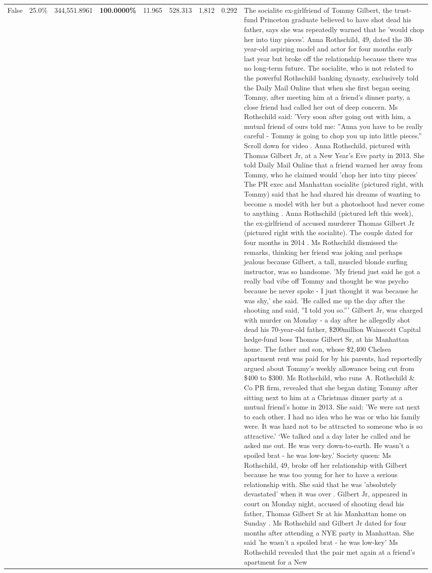 \begin{table}[H]
\begin{tabular}{lllrlllll}
False & 25.0\% & 344,551.8961 & \bfseries \color{red} 100.0000\% & 11.965 & 528.313 & 1,812 & 0.292 & The socialite ex-girlfriend of Tommy Gilbert, the trust-fund Princeton graduate believed to have shot dead his father, says she was repeatedly warned that he 'would chop her into tiny pieces'. Anna Rothschild, 49, dated the 30-year-old aspiring model and actor for four months early last year but broke off the relationship because there was no long-term future. The socialite, who is not related to the powerful Rothschild banking dynasty, exclusively told the Daily Mail Online that when she first began seeing Tommy, after meeting him at a friend's dinner party, a close friend had called her out of deep concern. Ms Rothschild said: 'Very soon after going out with him, a mutual friend of ours told me: ''Anna you have to be really careful - Tommy is going to chop you up into little pieces.'' Scroll down for video . Anna Rothschild, pictured with Thomas Gilbert Jr, at a New Year's Eve party in 2013. She told Daily Mail Online that a friend warned her away from Tommy, who he claimed would 'chop her into tiny pieces' The PR exec and Manhattan socialite (pictured right, with Tommy) said that he had shared his dreams of wanting to become a model with her but a photoshoot had never come to anything . Anna Rothschild (pictured left this week), the ex-girlfriend of accused murderer Thomas Gilbert Jr (pictured right with the socialite). The couple dated for four months in 2014 . Ms Rothschild dismissed the remarks, thinking her friend was joking and perhaps jealous because Gilbert, a tall, muscled blonde surfing instructor, was so handsome. 'My friend just said he got a really bad vibe off Tommy and thought he was psycho because he never spoke - I just thought it was because he was shy,' she said. 'He called me up the day after the shooting and said, ''I told you so.''' Gilbert Jr, was charged with murder on Monday - a day after he allegedly shot dead his 70-year-old father, \$200million Wainscott Capital hedge-fund boss Thomas Gilbert Sr, at his Manhattan home. The father and son, whose \$2,400 Chelsea apartment rent was paid for by his parents, had reportedly argued about Tommy's weekly allowance being cut from \$400 to \$300. Ms Rothschild, who runs A. Rothschild \& Co PR firm, revealed that she began dating Tommy after sitting next to him at a Christmas dinner party at a mutual friend's home in 2013. She said: 'We were sat next to each other. I had no idea who he was or who his family were. It was hard not to be attracted to someone who is so attractive.' ‘We talked and a day later he called and he asked me out. He was very down-to-earth. He wasn’t a spoiled brat - he was low-key.’ Society queen: Ms Rothschild, 49, broke off her relationship with Gilbert because he was too young for her to have a serious relationship with. She said that he was 'absolutely devastated' when it was over . Gilbert Jr, appeared in court on Monday night, accused of shooting dead his father, Thomas Gilbert Sr at his Manhattan home on Sunday . Ms Rothschild and Gilbert Jr dated for four months after attending a NYE party in Manhattan. She said 'he wasn't a spoiled brat - he was low-key' Ms Rothschild revealed that the pair met again at a friend’s apartment for a New 
\end{tabular}
\end{table}
